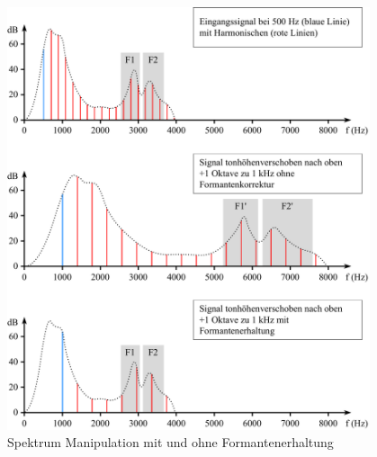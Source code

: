 \begin{figure}
    \centering
    \includegraphics[width=0.95\textwidth]{papers/autotune/images/Formanten-Erhaltung.pdf}
    \caption{Spektrum Manipulation mit und ohne Formantenerhaltung}
    \label{autotune:fig:formantenErhaltung}
\end{figure}



